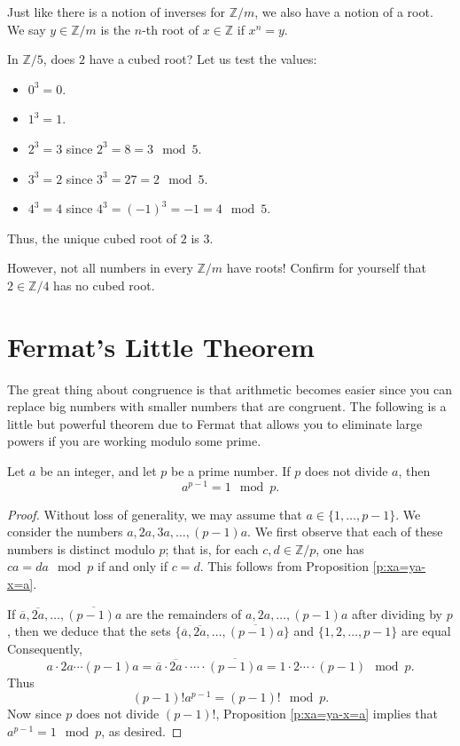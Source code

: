 \documentclass[11pt,dvipsnames]{book}
\numberwithin{figure}{section} %
\numberwithin{table}{section} %
\begin{document}
Just like there is a notion of inverses for $\mathbb{Z}/m$, we also have a notion of a root. We say $y\in\mathbb{Z}/m$ is the $n$-th root of $x\in\mathbb{Z}$ if $x^n=y$.

\begin{example}
In $\mathbb{Z}/{5}$, does $2$ have a cubed root?
Let us test the values:

\begin{itemize}
\item $0^{3}=0$.
\item $1^{3}=1$.
\item $2^{3}=3$ since $2^{3} = 8 = 3\mod 5$.
\item $3^{3}=2$ since $3^{3} = 27 = 2\mod 5$.
\item $4^{3}=4$ since $4^{3} = (-1)^{3}=-1 = 4 \mod 5$.
\end{itemize}
Thus, the unique cubed root of $2$ is $3$. \\
\end{example}

However, not all numbers in every $\mathbb{Z}/m$ have roots! Confirm for yourself that $2\in\mathbb{Z}/{4}$ has no cubed root.

\section{Fermat's Little Theorem}%
\label{Fermatlittle}

The great thing about congruence is that arithmetic  becomes easier since you can replace big numbers with smaller numbers that are congruent. The following is a little but powerful theorem due to Fermat that allows you to eliminate large powers if you are working modulo some prime.

\begin{theorem}
Let $a$ be an integer, and let $p$ be a prime number.
If $p$ does not divide $a$, then
\[
a^{p-1} = 1 \mod p.
\]
\end{theorem}

\begin{proof}
Without loss of generality, we may assume that $a \in \{1,\dots,p-1\}$.
We consider the numbers $a,2a,3a,\dots,(p-1)a$. We first observe that each of these numbers is distinct modulo $p$;
that is, for each $c,d\in \mathbb{Z}/p$, one has $ca = da\mod p$ if and only if $c=d$.
This follows from Proposition \ref{p:xa=ya-x=a}.

If $\overline{a},\overline{2a}, \dots, \overline{(p-1)a}$ are the remainders of $a,2a,\dots,(p-1)a$ after dividing by $p$, then we deduce that the sets $\{\overline{a},\overline{2a}, \dots, \overline{(p-1)a}\}$ and $\{1,2,\dots,p-1\}$ are equal
Consequently,
\[
a\cdot 2a \cdots (p-1)a = \overline{a}\cdot\overline{2a}\cdot \cdots\cdot \overline{(p-1)a} = 1\cdot 2 \cdots \cdot (p-1) \mod p.\]
Thus
\[
(p-1)!a^{p-1} = (p-1)!\mod p.
\]
Now since $p$ does not divide $(p-1)!$, Proposition \ref{p:xa=ya-x=a} implies that $a^{p-1} = 1 \mod p$, as desired.
\end{proof}
\end{document}
